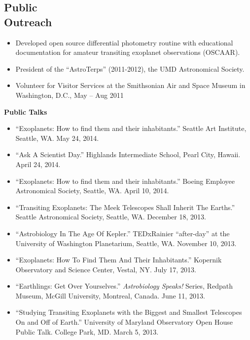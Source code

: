 \documentclass[margin]{res}
\begin{document}
\begin{resume}
\section{Public \\ Outreach}             
            \begin{itemize}   
            \item Developed open source differential photometry routine with educational documentation for amateur transiting exoplanet observations (OSCAAR).
	        \item President of the ``AstroTerps'' (2011-2012), the UMD Astronomical Society.
            \item Volunteer for Visitor Services at the Smithsonian Air and Space Museum in Washington, D.C., May -- Aug 2011
            \end{itemize}
	   \textbf{Public Talks}
            \begin{itemize}
            \item ``Exoplanets: How to find them and their inhabitants.'' Seattle Art Institute, Seattle, WA. May 24, 2014.
            \item ``Ask A Scientist Day.'' Highlands Intermediate School, Pearl City, Hawaii. April 24, 2014.
            \item ``Exoplanets: How to find them and their inhabitants.'' Boeing Employee Astronomical Society, Seattle, WA. April 10, 2014.
            \item ``Transiting Exoplanets: The Meek Telescopes Shall Inherit The Earths.'' Seattle Astronomical Society, Seattle, WA. December 18, 2013.
            	\item ``Astrobiology In The Age Of Kepler.'' TEDxRainier ``after-day'' at the University of Washington Planetarium, Seattle, WA. November 10, 2013. 
                \item ``Exoplanets: How To Find Them And Their Inhabitants.'' Kopernik Observatory and Science Center, Vestal, NY. July 17, 2013. 
	       \item ``Earthlings: Get Over Yourselves.'' \textit{Astrobiology Speaks!} Series, Redpath Museum, McGill University, Montreal, Canada. June 11, 2013.	   
	       \item ``Studying Transiting Exoplanets with the Biggest and Smallest Telescopes On and Off of Earth.'' University of Maryland Observatory Open House Public Talk. College Park, MD. March 5, 2013.
            \end{itemize}
            

\end{resume}
\end{document}
